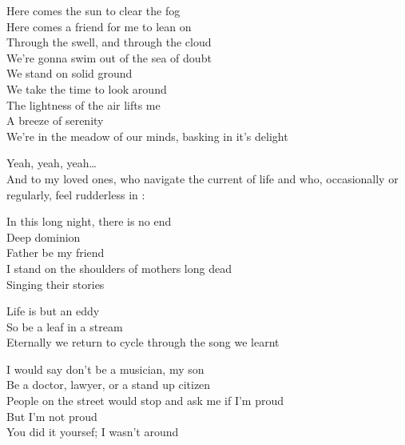 
Here comes the sun to clear the fog \\
Here comes a friend for me to lean on \\
Through the swell, and through the cloud \\
We're gonna swim out of the sea of doubt \\

We stand on solid ground \\
We take the time to look around \\
The lightness of the air lifts me \\
A breeze of serenity \\
We're in the meadow of our minds, basking in it's delight \\




Yeah, yeah, yeah… \\
And to my loved ones, who navigate the current of life and who, occasionally or regularly, feel rudderless in : \\


In this long night, there is no end \\
Deep dominion \\
Father be my friend \\
I stand on the shoulders of mothers long dead \\
Singing their stories \\


Life is but an eddy \\
So be a leaf in a stream \\
Eternally we return to cycle through the song we learnt \\


I would say don't be a musician, my son \\
Be a doctor, lawyer, or a stand up citizen \\
People on the street would stop and ask me if I'm proud \\
But I'm not proud \\
You did it yoursef; I wasn't around \\

